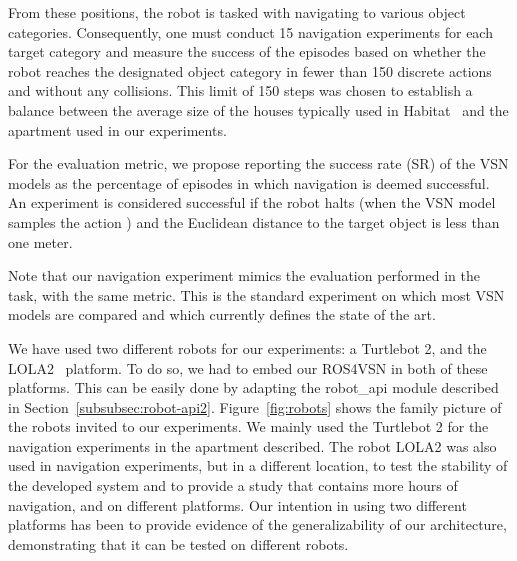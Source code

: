 From these positions, the robot is tasked with navigating to various object categories.
Consequently, one must conduct 15 navigation experiments for each target category and measure the success of the episodes based on whether the robot reaches the designated object category in fewer than 150 discrete actions and without any collisions.
This limit of 150 steps was chosen to establish a balance between the average size of the houses typically used in Habitat~\cite{NEURIPS2021_021bbc7e} and the apartment used in our experiments.

For the evaluation metric, we propose reporting the success rate (SR) of the VSN models as the percentage of episodes in which navigation is deemed successful.
An experiment is considered successful if the robot halts (when the VSN model samples the action \stopac) and the Euclidean distance to the target object is less than one meter.

Note that our navigation experiment mimics the evaluation performed in the \objnav~\cite{batra2020} task, with the same metric.
This is the standard experiment on which most VSN models are compared and which currently defines the state of the art.


We have used two different robots for our experiments: a Turtlebot 2, and the LOLA2~\cite{LOLA} platform.
To do so, we had to embed our ROS4VSN in both of these platforms.
This can be easily done by adapting the robot\_api module described in Section~\ref{subsubsec:robot-api2}.
Figure~\ref{fig:robots} shows the family picture of the robots invited to our experiments.
We mainly used the Turtlebot 2 for the navigation experiments in the apartment described.
The robot LOLA2 was also used in navigation experiments, but in a different location, to test the stability of the developed system and to provide a study that contains more hours of navigation, and on different platforms.
Our intention in using two different platforms has been to provide evidence of the generalizability of our architecture, demonstrating that it can be tested on different robots.

